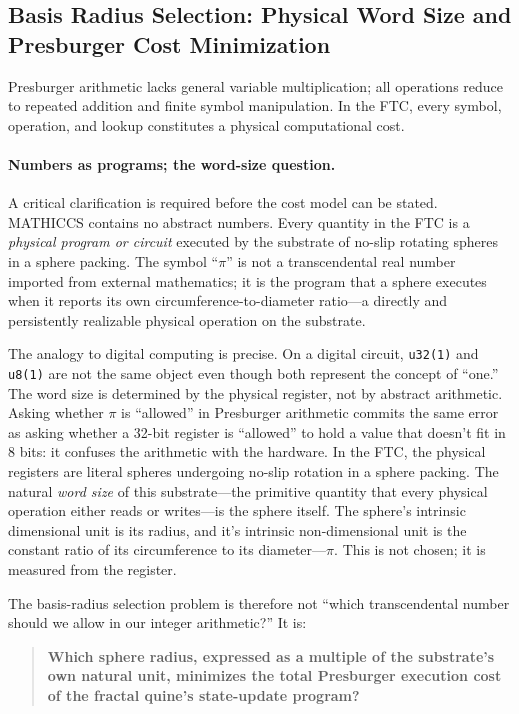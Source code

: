 \documentclass[11pt,a4paper]{article}
\begin{document}
\subsection{Basis Radius Selection: Physical Word Size and Presburger Cost Minimization}
 
Presburger arithmetic lacks general variable multiplication; all operations reduce to repeated addition and finite symbol manipulation. In the FTC, every symbol, operation, and lookup constitutes a physical computational cost.

\paragraph{Numbers as programs; the word-size question.}

A critical clarification is required before the cost model can be stated. MATHICCS contains no abstract numbers. Every quantity in the FTC is a \emph{physical program or circuit} executed by the substrate of no-slip rotating spheres in a sphere packing. The symbol ``$\pi$'' is not a transcendental real number imported from external mathematics; it is the program that a sphere executes when it reports its own circumference-to-diameter ratio---a directly and persistently realizable physical operation on the substrate.

The analogy to digital computing is precise. On a digital circuit, \texttt{u32(1)} and \texttt{u8(1)} are not the same object even though both represent the concept of ``one.'' The word size is determined by the physical register, not by abstract arithmetic. Asking whether $\pi$ is ``allowed'' in Presburger arithmetic commits the same error as asking whether a 32-bit register is ``allowed'' to hold a value that doesn't fit in 8 bits: it confuses the arithmetic with the hardware. 
In the FTC, the physical registers are literal spheres undergoing no-slip rotation in a sphere packing. The natural \emph{word size} of this substrate---the primitive quantity that every physical operation either reads or writes---is the sphere itself. The sphere's intrinsic dimensional unit is its radius, and it's intrinsic non-dimensional unit is the constant ratio of its circumference to its diameter---$\pi$. This is not chosen; it is measured from the register.

The basis-radius selection problem is therefore not ``which transcendental number should we allow in our integer arithmetic?'' It is:

\begin{quote}
\textbf{Which sphere radius, expressed as a multiple of the substrate's own natural unit, minimizes the total Presburger execution cost of the fractal quine's state-update program?}
\end{quote}
\end{document}
